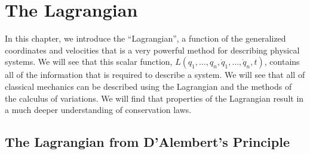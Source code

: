 %
\chapter{The Lagrangian}
In this chapter, we introduce the ``Lagrangian'', a function of the generalized coordinates and velocities that is a very powerful method for describing physical systems. We will see that this scalar function, $L(q_1,\dots ,q_n,\dot{q}_1,\dots ,\dot{q}_n,t)$, contains all of the information that is required to describe a system. We will see that all of classical mechanics can be described using the Lagrangian and the methods of the calculus of variations. We will find that properties of the Lagrangian result in a much deeper understanding of conservation laws. 

\section{The Lagrangian from D'Alembert's Principle}
